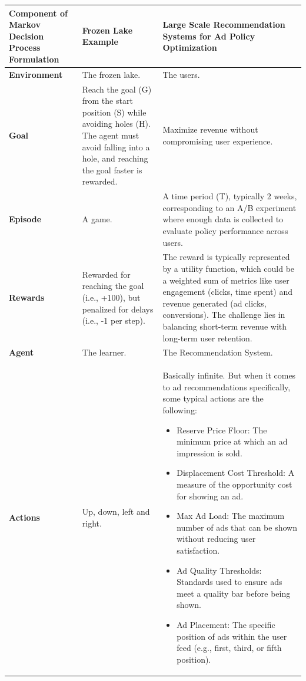 \documentclass[final]{anthology-ch}         %
\begin{document}
\begin{table}[ht]
    \centering
    \small
    \begin{tabular}{|>{\centering\arraybackslash}p{3cm}|p{3.5cm}|p{9cm}|}
        \hline
        \textbf{Component of Markov Decision Process Formulation} & \textbf{Frozen Lake Example} & \textbf{Large Scale Recommendation Systems for Ad Policy Optimization} \\ 
        \hline
        \textbf{Environment} & The frozen lake. & The users. \\ 
        \hline
        \textbf{Goal} & Reach the goal (G) from the start position (S) while avoiding holes (H). The agent must avoid falling into a hole, and reaching the goal faster is rewarded. & Maximize revenue without compromising user experience. \\ 
         \hline
          \textbf{Episode} & A game. & A time period (T), typically 2 weeks, corresponding to an A/B experiment where enough data is collected to evaluate policy performance across users. \\ 
        \hline
        \textbf{Rewards} & Rewarded for reaching the goal (i.e., +100), but penalized for delays (i.e., -1 per step). & 
        The reward is typically represented by a utility function, which could be a weighted sum of metrics like user engagement (clicks, time spent) and revenue generated (ad clicks, conversions). The challenge lies in balancing short-term revenue with long-term user retention. \\ 
        \hline
        \textbf{Agent} & The learner. & The Recommendation System. \\ 
        \hline
        \textbf{Actions} & Up, down, left and right. & 
        Basically infinite. But when it comes to ad recommendations specifically, some typical actions are the following: 
        \begin{itemize}
            \item Reserve Price Floor: The minimum price at which an ad impression is sold.
            \item Displacement Cost Threshold: A measure of the opportunity cost for showing an ad.
            \item Max Ad Load: The maximum number of ads that can be shown without reducing user satisfaction.
            \item Ad Quality Thresholds: Standards used to ensure ads meet a quality bar before being shown.
            \item Ad Placement: The specific position of ads within the user feed (e.g., first, third, or fifth position).

\end{itemize}
\end{tabular}
\end{table}
\end{document}
